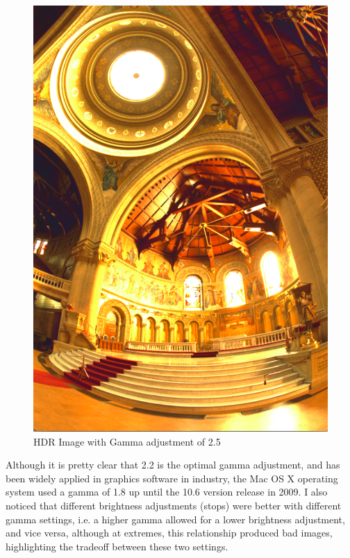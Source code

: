 \documentclass[a4paper,12pt,oneside,final]{report}
\newenvironment{changemargin}[2]{\begin{list}{}{%
\setlength{\topsep}{0pt}%
\setlength{\leftmargin}{0pt}%
\setlength{\rightmargin}{0pt}%
\setlength{\listparindent}{\parindent}%
\setlength{\itemindent}{\parindent}%
\setlength{\parsep}{0pt plus 1pt}%
\addtolength{\leftmargin}{#1}%
\addtolength{\rightmargin}{#2}%
}\item }{\end{list}}
\begin{document}
\begin{figure}[!h]
\begin{changemargin}{-50mm}{-50mm}
\center
\includegraphics[scale=0.35]{memorial_gamma_25.png}
\caption{HDR Image with Gamma adjustment of 2.5}
\end{changemargin}
\end{figure}

Although it is pretty clear that 2.2 is the optimal gamma adjustment, and has been widely applied in graphics software in industry, the Mac OS X operating system used a gamma of 1.8 up until the 10.6 version release in 2009.  I also noticed that different brightness adjustments (stops) were better with different gamma settings, i.e. a higher gamma allowed for a lower brightness adjustment, and vice versa, although at extremes, this relationship produced bad images, highlighting the tradeoff between these two settings.
\end{document}
